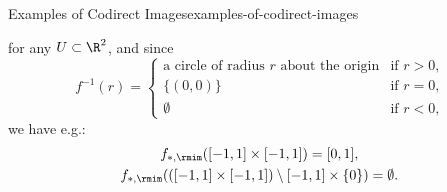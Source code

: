 \begin{example}{Examples of Codirect Images}{examples-of-codirect-images}
\begin{enumerate}
\[            \]%
            for any $U\subset\R^{2}$, and since
            \[
                f^{-1}(r)%
                =
                \begin{cases}
                    \text{a circle of radius $r$ about the origin} &\text{if $r>0$,}\\
                    \{(0,0)\}                                      &\text{if $r=0$,}\\
                    \emptyset                                      &\text{if $r<0$,}
                \end{cases}
            \]%
            we have e.g.:
            \begin{gather*}
                f_{*,\rmim}([-1,1]\times[-1,1])                             = [0,1],\\
                f_{*,\rmim}(([-1,1]\times[-1,1])\setminus[-1,1]\times\{0\}) = \emptyset.
            \end{gather*}
    \end{enumerate}
\end{example}

